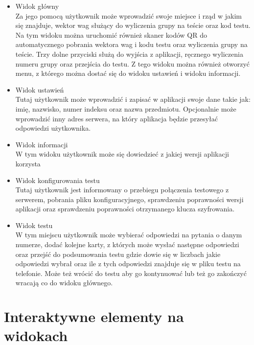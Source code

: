 \documentclass{report}
\begin{document}
		\begin{itemize}
			\item Widok główny\\
			Za jego pomocą użytkownik może wprowadzić swoje miejsce i rząd w jakim się znajduje, wektor wag służący do wyliczenia grupy na teście oraz kod testu. Na tym widoku można uruchomić również skaner kodów QR do automatycznego pobrania wektora wag i kodu testu oraz wyliczenia grupy na teście. Trzy dolne przyciski służą do wyjścia z aplikacji, ręcznego wyliczenia numeru grupy oraz przejścia do testu. Z tego widoku można również otworzyć menu, z którego można dostać się do widoku ustawień i widoku informacji.
			
			\item Widok ustawień\\
			Tutaj użytkownik może wprowadzić i zapisać w aplikacji swoje dane takie jak: imię, nazwisko, numer indeksu oraz nazwa przedmiotu. Opcjonalnie może wprowadzić inny adres serwera, na który aplikacja będzie przesyłać odpowiedzi użytkownika.
			
			\item Widok informacji\\
			W tym widoku użytkownik może się dowiedzieć z jakiej wersji aplikacji korzysta
			
			\item Widok konfigurowania testu\\
			Tutaj użytkownik jest informowany o przebiegu połączenia testowego z serwerem, pobrania pliku konfiguracyjnego, sprawdzeniu poprawności wersji aplikacji oraz sprawdzeniu poprawności otrzymanego klucza szyfrowania.
			
			\item Widok testu\\
			W tym miejscu użytkownik może wybierać odpowiedzi na pytania o danym numerze, dodać kolejne karty, z których może wysłać następne odpowiedzi oraz przejść do podsumowania testu gdzie dowie się w liczbach jakie odpowiedzi wybrał oraz ile z tych odpowiedzi znajduje się w pliku testu na telefonie. Może też wrócić do testu aby go kontynuować lub też go zakończyć wracają co do widoku głównego.
			
		\end{itemize}
		
		\section{Interaktywne elementy na widokach}
		
\end{document}
